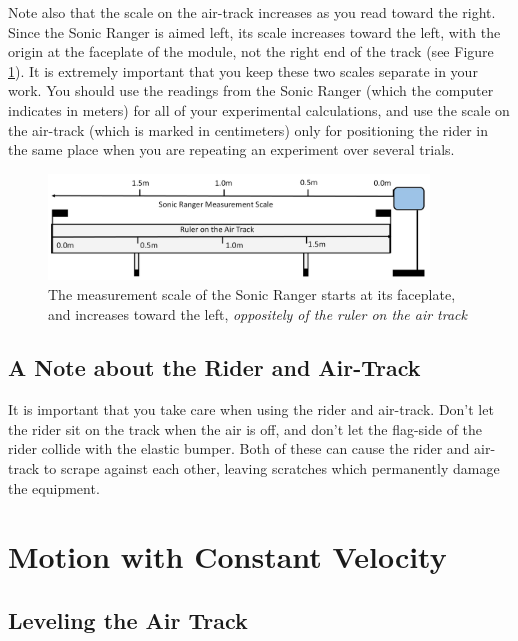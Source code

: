 Note also that the scale on the air-track increases as you read toward the right.  Since the Sonic Ranger is aimed left, its scale increases toward the left, with the origin at the faceplate of the module, not the right end of the track (see Figure \ref{fig:measurement}).  It is extremely important that you keep these two scales separate in your work.  You should use the readings from the Sonic Ranger (which the computer indicates in meters) for all of your experimental calculations, and use the scale on the air-track (which is marked in centimeters) only for positioning the rider in the same place when you are repeating an experiment over several trials.
\begin{figure}[h]
    \begin{center}
        \includegraphics[width=0.9\textwidth]{./Exp2/pic/image12.jpg}
    \end{center}
    \caption{The measurement scale of the Sonic Ranger starts at its faceplate, and increases toward the left, \emph{oppositely of the ruler on the air track}}
    \label{fig:measurement}
\end{figure}

\subsection{A Note about the Rider and Air-Track}

It is important that you take care when using the rider and air-track.  Don't let the rider sit on the track when the air is off, and don't let the flag-side of the rider collide with the elastic bumper. Both of these can cause the rider and air-track to scrape against each other, leaving scratches which permanently damage the equipment.

\section{Motion with Constant Velocity}

\subsection{Leveling the Air Track}

